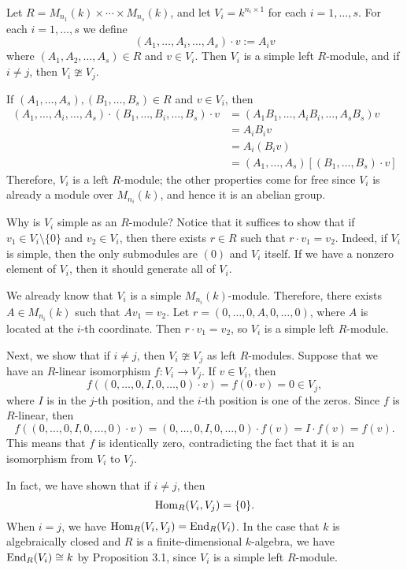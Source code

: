 \begin{lemma}
    Let $R = M_{n_1}(k) \times \cdots \times M_{n_s}(k)$, and let 
    $V_i = k^{n_i \times 1}$ for each $i = 1, \dots, s$. For each 
    $i = 1, \dots, s$ we define 
    \[ (A_1, \dots, A_i, \dots, A_s) \cdot v := A_i v \] 
    where $(A_1, A_2, \dots, A_s) \in R$ and $v \in V_i$. 
    Then $V_i$ is a simple left $R$-module, and if $i \neq j$, then 
    $V_i \ncong V_j$. 
\end{lemma}
\begin{pf}
    If $(A_1, \dots, A_s), (B_1, \dots, B_s) \in R$ and $v \in V_i$, then 
    \begin{align*} 
        (A_1, \dots, A_i, \dots, A_s) \cdot (B_1, \dots, B_i, \dots, B_s) \cdot v 
        &= (A_1B_1, \dots, A_iB_i, \dots, A_sB_s) v \\ 
        &= A_iB_i v \\ 
        &= A_i(B_i v) \\ 
        &= (A_1, \dots, A_s) [(B_1, \dots, B_s) \cdot v] 
    \end{align*} 
    Therefore, $V_i$ is a left $R$-module; the other properties come for free 
    since $V_i$ is already a module over $M_{n_i}(k)$, and hence it is an abelian 
    group. 

    Why is $V_i$ simple as an $R$-module? Notice that it suffices to show that 
    if $v_1 \in V_i \setminus \{0\}$ and $v_2 \in V_i$, then there exists 
    $r \in R$ such that $r \cdot v_1 = v_2$. Indeed, if $V_i$ is simple, then 
    the only submodules are $(0)$ and $V_i$ itself. If we have a nonzero 
    element of $V_i$, then it should generate all of $V_i$. 

    We already know that $V_i$ is a simple $M_{n_i}(k)$-module. Therefore, 
    there exists $A \in M_{n_i}(k)$ such that $Av_1 = v_2$. Let 
    $r = (0, \dots, 0, A, 0, \dots, 0)$, where $A$ is located at the 
    $i$-th coordinate. Then $r \cdot v_1 = v_2$, so $V_i$ is a simple 
    left $R$-module. 

    Next, we show that if $i \neq j$, then $V_i \ncong V_j$ as left $R$-modules. 
    Suppose that we have an $R$-linear isomorphism $f : V_i \to V_j$. 
    If $v \in V_i$, then 
    \[ f((0, \dots, 0, I, 0, \dots, 0) \cdot v) = f(0 \cdot v) = 0 \in V_j, \] 
    where $I$ is in the $j$-th position, and the $i$-th position is one of the 
    zeros. Since $f$ is $R$-linear, then 
    \[ f((0, \dots, 0, I, 0, \dots, 0) \cdot v) = (0, \dots, 0, I, 0, \dots, 0)
    \cdot f(v) = I \cdot f(v) = f(v). \] 
    This means that $f$ is identically zero, contradicting the fact that 
    it is an isomorphism from $V_i$ to $V_j$. 
\end{pf}

\begin{remark}
    In fact, we have shown that if $i \neq j$, then 
    \[ \operatorname{Hom}_R(V_i, V_j) = \{0\}. \] 
    When $i = j$, we have $\operatorname{Hom}_R(V_i, V_j) = \operatorname{End}_R(V_i)$. In the case that 
    $k$ is algebraically closed and $R$ is a finite-dimensional $k$-algebra, 
    we have $\operatorname{End}_R(V_i) \cong k$ by Proposition 3.1, since $V_i$ is a simple 
    left $R$-module. 
\end{remark}
